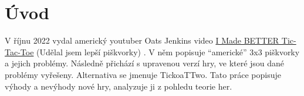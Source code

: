 \makeatletter
\renewcommand{\@chapapp}{}%
\newenvironment{chapquote}[2][2em]
  {\setlength{\@tempdima}{#1}%
   \def\chapquote@author{#2}%
   \parshape 1 \@tempdima \dimexpr\textwidth-2\@tempdima\relax%
   \itshape}
  {\par\normalfont\hfill--\ \chapquote@author\hspace*{\@tempdima}\par\bigskip}
\makeatother

\chapter*{Úvod}

V říjnu 2022 vydal americký youtuber Oats Jenkins video
\href{https://www.youtube.com/watch?v=ePxrVU4M9uA}{I Made BETTER Tic-Tac-Toe}
(Udělal jsem lepší piškvorky) \cite{jenkins22}. V něm popisuje \enquote{americké} 3x3 piškvorky a jejich
problémy. Následně přichází s upravenou verzí hry, ve které jsou dané problémy vyřešeny.
Alternativa se jmenuje TickoaTTwo. Tato práce popisuje výhody a nevýhody nové hry, analyzuje ji z pohledu teorie her.

